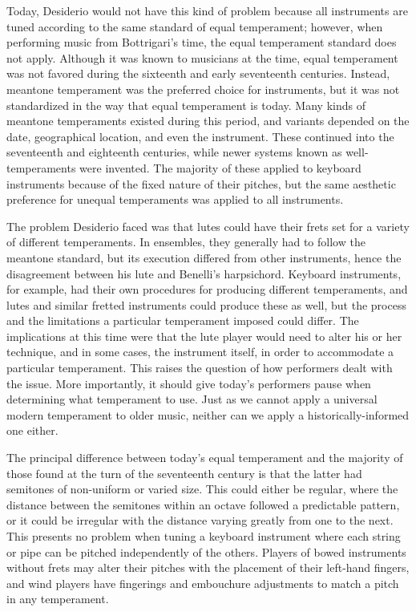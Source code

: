 Today, Desiderio would not have this kind of problem because all instruments are tuned according to the same standard of
equal temperament; however, when performing music from Bottrigari's time, the equal temperament standard does not
apply. Although it was known to musicians at the time, equal temperament was not favored during the sixteenth and early
seventeenth centuries. Instead, meantone temperament was the preferred choice for instruments, but it was not
standardized in the way that equal temperament is today. Many kinds of meantone temperaments existed during this
period, and variants depended on the date, geographical location, and even the instrument. These continued into the
seventeenth and eighteenth centuries, while newer systems known as well-temperaments were invented. The majority of
these applied to keyboard instruments because of the fixed nature of their pitches, but the same aesthetic preference
for unequal temperaments was applied to all instruments.

The problem Desiderio faced was that lutes could have their frets set for a variety of different temperaments. In
ensembles, they generally had to follow the meantone standard, but its execution differed from other instruments, hence
the disagreement between his lute and Benelli's harpsichord. Keyboard instruments, for example, had their own
procedures for producing different temperaments, and lutes and similar fretted instruments could produce these as well,
but the process and the limitations a particular temperament imposed could differ. The implications at this time were
that the lute player would need to alter his or her technique, and in some cases, the instrument itself, in order to
accommodate a particular temperament. This raises the question of how performers dealt with the issue. More importantly,
it should give today's performers pause when determining what temperament to use. Just as we cannot apply a universal
modern temperament to older music, neither can we apply a historically-informed one either.

The principal difference between today's equal temperament and the majority of those found at the turn of the
seventeenth century is that the latter had semitones of non-uniform or varied size. This could either be regular, where
the distance between the semitones within an octave followed a predictable pattern, or it could be irregular with the
distance varying greatly from one to the next. This presents no problem when tuning a keyboard instrument where each
string or pipe can be pitched independently of the others. Players of bowed instruments without frets may alter their
pitches with the placement of their left-hand fingers, and wind players have fingerings and embouchure adjustments to
match a pitch in any temperament.


